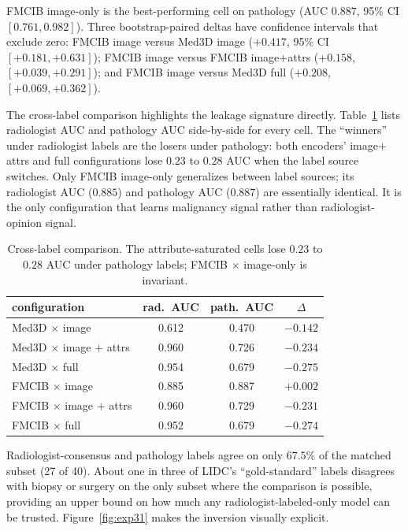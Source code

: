 \documentclass[10pt,letterpaper,twocolumn]{article}
\begin{document}
FMCIB image-only is the best-performing cell on pathology (AUC $0.887$, 95\% CI $[0.761, 0.982]$). Three bootstrap-paired deltas have confidence intervals that exclude zero: FMCIB image versus Med3D image ($+0.417$, 95\% CI $[+0.181, +0.631]$); FMCIB image versus FMCIB image$+$attrs ($+0.158$, $[+0.039, +0.291]$); and FMCIB image versus Med3D full ($+0.208$, $[+0.069, +0.362]$).

The cross-label comparison highlights the leakage signature directly. Table~\ref{tab:cross-label} lists radiologist AUC and pathology AUC side-by-side for every cell. The ``winners'' under radiologist labels are the losers under pathology: both encoders' image$+$attrs and full configurations lose $0.23$ to $0.28$ AUC when the label source switches. Only FMCIB image-only generalizes between label sources; its radiologist AUC ($0.885$) and pathology AUC ($0.887$) are essentially identical. It is the only configuration that learns malignancy signal rather than radiologist-opinion signal.

\begin{table}[t]
\centering
\caption{Cross-label comparison. The attribute-saturated cells lose $0.23$ to $0.28$ AUC under pathology labels; FMCIB $\times$ image-only is invariant.}
\label{tab:cross-label}
\small
\begin{tabular}{lccc}
\toprule
configuration & rad.\ AUC & path.\ AUC & $\Delta$ \\
\midrule
Med3D $\times$ image                 & 0.612 & 0.470 & $-0.142$ \\
Med3D $\times$ image $+$ attrs       & 0.960 & 0.726 & $-0.234$ \\
Med3D $\times$ full                  & 0.954 & 0.679 & $-0.275$ \\
FMCIB $\times$ image                 & 0.885 & 0.887 & $+0.002$ \\
FMCIB $\times$ image $+$ attrs       & 0.960 & 0.729 & $-0.231$ \\
FMCIB $\times$ full                  & 0.952 & 0.679 & $-0.274$ \\
\bottomrule
\end{tabular}
\end{table}

Radiologist-consensus and pathology labels agree on only $67.5\%$ of the matched subset (27 of 40). About one in three of LIDC's ``gold-standard'' labels disagrees with biopsy or surgery on the only subset where the comparison is possible, providing an upper bound on how much any radiologist-labeled-only model can be trusted. Figure~\ref{fig:exp31} makes the inversion visually explicit.
\end{document}

